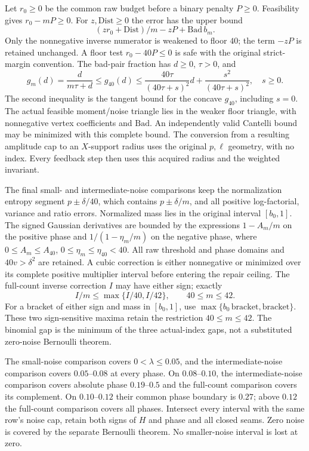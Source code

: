 Let $r_0\ge0$ be the common raw budget before a binary penalty $P\ge0$.
Feasibility gives $r_0-mP\ge0$. For $z,\mathrm{Dist}\ge0$ the
error has the upper bound
\[
 (zr_0+\mathrm{Dist})/m-zP+\mathrm{Bad}\,b_m.
\]
Only the nonnegative inverse numerator is weakened to floor $40$; the term
$-zP$ is retained unchanged. A floor test $r_0-40P\le0$ is safe
with the original strict-margin convention. The bad-pair fraction has
$d\ge0$, $\tau>0$, and
\[
 g_m(d)=\frac d{m\tau+d}\le g_{40}(d)
 \le\frac{40\tau}{(40\tau+s)^2}d+\frac{s^2}{(40\tau+s)^2},\quad s\ge0.
\]
The second inequality is the tangent bound for the concave $g_{40}$,
including $s=0$. The actual feasible moment/noise triangle lies in the
weaker floor triangle, with nonnegative vertex coefficients and
$\mathrm{Bad}$. An independently valid Cantelli bound may be minimized
with this complete bound. The conversion from a resulting amplitude cap to
an $X$-support radius uses the original $p,\ell$ geometry, with no index.
Every feedback step then uses this acquired radius and the weighted invariant.

The final small- and intermediate-noise comparisons keep the normalization entropy segment
$p\pm\delta/40$, which contains $p\pm\delta/m$, and all positive
log-factorial, variance and ratio errors. Normalized mass lies in the
original interval $[b_0,1]$. The signed Gaussian derivatives are bounded
by the expressions $1-A_m/m$ on the positive phase and
$1/(1-\eta_m/m)$ on the negative phase, where
$0\le A_m\le A_{40}$, $0\le\eta_m\le\eta_{40}<40$.
All raw threshold and phase domains and $40v>\delta^2$ are retained.
A cubic correction is either nonnegative or minimized over its complete
positive multiplier interval before entering the repair ceiling.
The full-count inverse correction $I$ may have either sign; exactly
\[
 I/m\le\max\{I/40,I/42\},\qquad40\le m\le42.
\]
For a bracket of either sign and mass in $[b_0,1]$, use
$\max\{b_0\,\mathrm{bracket},\mathrm{bracket}\}$. These two
sign-sensitive maxima retain the restriction $40\le m\le42$. The binomial gap is the minimum of the three actual-index gaps,
not a substituted zero-noise Bernoulli theorem.

The small-noise comparison covers $0<\lambda\le0.05$, and the
intermediate-noise comparison covers $0.05$--$0.08$ at every phase.
On $0.08$--$0.10$, the intermediate-noise comparison covers absolute
phase $0.19$--$0.5$ and the full-count comparison covers its complement.
On $0.10$--$0.12$ their common phase boundary is $0.27$; above $0.12$
the full-count comparison covers all phases. Intersect every interval with the same
row's noise cap, retain both signs of $H$ and phase and all closed seams.
Zero noise is covered by the separate Bernoulli theorem. No smaller-noise
interval is lost at zero.

